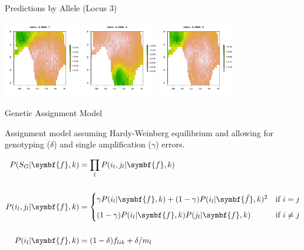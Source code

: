 \documentclass[11pt,ignorenonframetext,]{beamer}
\begin{document}
\begin{frame}{Predictions by Allele (Locus 3)}
\begin{center}
\includegraphics[width=0.25\textwidth]{figs/allele3/Med-Al3-7.png}
\includegraphics[width=0.25\textwidth]{figs/allele3/Med-Al3-8.png}
\includegraphics[width=0.25\textwidth]{figs/allele3/Med-Al3-9.png}
\end{center}

\end{frame}

\begin{frame}{Genetic Assignment Model}
\protect\hypertarget{genetic-assignment-model}{}

Assignment model assuming Hardy-Weinberg equilibrium and allowing for
genotyping (\(\delta\)) and single amplification (\(\gamma\)) errors.

\[
\begin{aligned}
P(S_G|\symbf{f},k) &= \prod_l P(i_l, j_l | \symbf{f},k) \\
\\
P(i_l, j_l | \symbf{f},k) &= 
\begin{cases}
\gamma P(i_l|\symbf{f},k) + (1-\gamma)P(i_l|\symbf{\tilde f},k)^2 & \text{if $i=j$} \vspace{2mm} \\
(1-\gamma) P(i_l|\symbf{f},k) P(j_l|\symbf{f},k)      & \text{if $i \ne j$}
\end{cases} \\
\\
P(i_l|\symbf{f},k) &= (1-\delta) f_{lik} + \delta / m_l
\end{aligned}
\]

\end{frame}
\end{document}
